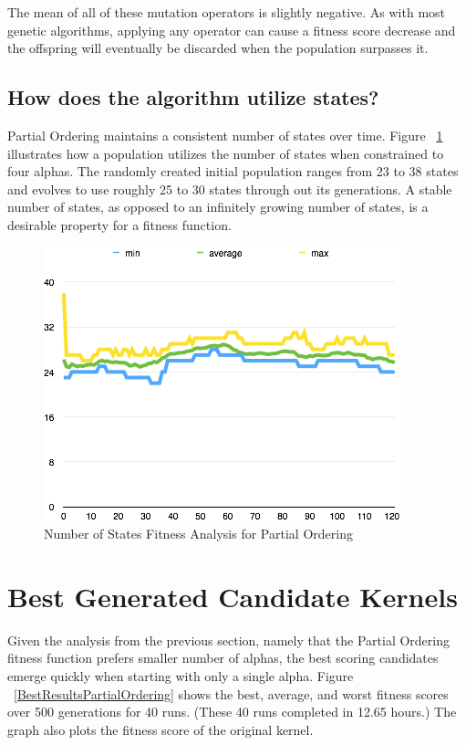 \documentclass[conference]{IEEEtran}
\begin{document}
The mean of all of these mutation operators is slightly negative. As with most genetic algorithms, applying any operator can cause a fitness score decrease and the offspring will eventually be discarded when the population surpasses it.

\subsection{How does the algorithm utilize states?}

Partial Ordering maintains a consistent number of states over time. Figure ~\ref{NumberOfStatesPartialOrdering} illustrates how a population utilizes the number of states when constrained to four alphas. The randomly created initial population ranges from 23 to 38 states and evolves to use roughly 25 to 30 states through out its generations. A stable number of states, as opposed to an infinitely growing number of states, is a desirable property for a fitness function. 

\begin{figure}[ht]
\includegraphics[scale=0.6]{images/number_of_states_partial_ordering}
\caption{Number of States Fitness Analysis for Partial Ordering}
\label{NumberOfStatesPartialOrdering}
\end{figure}


\section{Best Generated Candidate Kernels}

Given the analysis from the previous section, namely that the Partial Ordering fitness function prefers smaller number of alphas, the best scoring candidates emerge quickly when starting with only a single alpha. Figure ~\ref{BestResultsPartialOrdering} shows the best, average, and worst fitness scores over 500 generations for 40 runs. (These 40 runs completed in 12.65 hours.) The graph also plots the fitness score of the original kernel.
\end{document}

